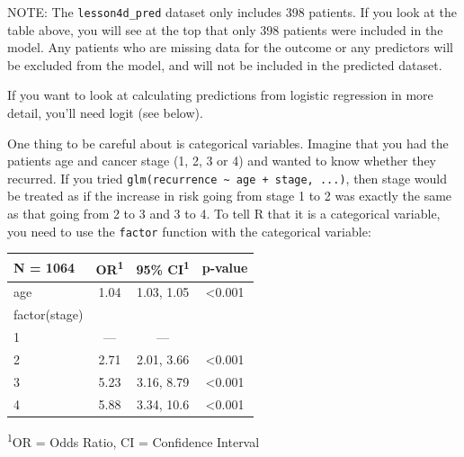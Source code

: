 \documentclass[]{book}
\newenvironment{Shaded}{\begin{snugshade}}{\end{snugshade}}
\newcommand{\DataTypeTok}[1]{\textcolor[rgb]{0.13,0.29,0.53}{#1}}
\newcommand{\KeywordTok}[1]{\textcolor[rgb]{0.13,0.29,0.53}{\textbf{#1}}}
\newcommand{\NormalTok}[1]{#1}
\newcommand{\OperatorTok}[1]{\textcolor[rgb]{0.81,0.36,0.00}{\textbf{#1}}}
\newcommand{\OtherTok}[1]{\textcolor[rgb]{0.56,0.35,0.01}{#1}}
\newcommand{\StringTok}[1]{\textcolor[rgb]{0.31,0.60,0.02}{#1}}
\begin{document}
NOTE: The \texttt{lesson4d\_pred} dataset only includes 398 patients. If you look at the table above, you will see at the top that only 398 patients were included in the model. Any patients who are missing data for the outcome or any predictors will be excluded from the model, and will not be included in the predicted dataset.

If you want to look at calculating predictions from logistic regression in more detail, you'll need logit (see below).

One thing to be careful about is categorical variables. Imagine that you had the patients age and cancer stage (1, 2, 3 or 4) and wanted to know whether they recurred. If you tried \texttt{glm(recurrence\ \textasciitilde{}\ age\ +\ stage,\ ...)}, then stage would be treated as if the increase in risk going from stage 1 to 2 was exactly the same as that going from 2 to 3 and 3 to 4. To tell R that it is a categorical variable, you need to use the \texttt{factor} function with the categorical variable:

\begin{Shaded}
\end{Shaded}

\captionsetup[table]{labelformat=empty,skip=1pt}
\begin{longtable}{lccc}
\toprule
\textbf{N = 1064} & \textbf{OR}\textsuperscript{1} & \textbf{95\% CI}\textsuperscript{1} & \textbf{p-value} \\ 
\midrule
age & 1.04 & 1.03, 1.05 & <0.001 \\ 
factor(stage) &  &  &  \\ 
1 & --- & --- &  \\ 
2 & 2.71 & 2.01, 3.66 & <0.001 \\ 
3 & 5.23 & 3.16, 8.79 & <0.001 \\ 
4 & 5.88 & 3.34, 10.6 & <0.001 \\ 
\bottomrule
\end{longtable}
\vspace{-5mm}
\begin{minipage}{\linewidth}
\textsuperscript{1}OR = Odds Ratio, CI = Confidence Interval \\ 
\end{minipage}
\end{document}
